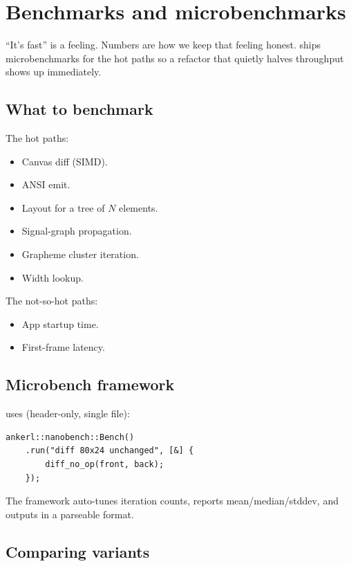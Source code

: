 \chapter{Benchmarks and microbenchmarks}
\label{ch:bench}

\begin{aside}
``It's fast'' is a feeling. Numbers are how we keep that
feeling honest. \maya{} ships microbenchmarks for the hot paths
so a refactor that quietly halves throughput shows up
immediately.
\end{aside}

\section{What to benchmark}

The hot paths:

\begin{itemize}[leftmargin=*]
  \item Canvas diff (SIMD).
  \item ANSI emit.
  \item Layout for a tree of $N$ elements.
  \item Signal-graph propagation.
  \item Grapheme cluster iteration.
  \item Width lookup.
\end{itemize}

The not-so-hot paths:

\begin{itemize}[leftmargin=*]
  \item App startup time.
  \item First-frame latency.
\end{itemize}

\section{Microbench framework}

\maya{} uses  (header-only, single file):

\begin{lstlisting}
ankerl::nanobench::Bench()
    .run("diff 80x24 unchanged", [&] {
        diff_no_op(front, back);
    });
\end{lstlisting}

The framework auto-tunes iteration counts, reports
mean/median/stddev, and outputs in a parseable format.

\section{Comparing variants}

